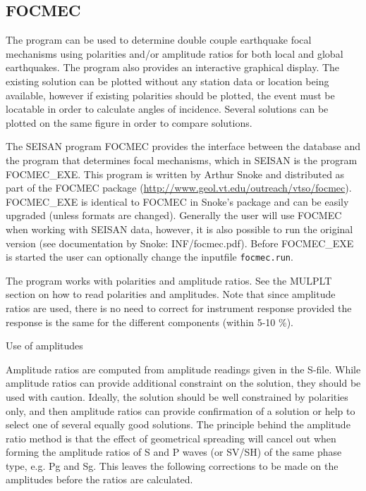 %
\subsection{FOCMEC}
\label{sect:focmec}

The program can be used to determine double couple earthquake focal 
mechanisms using polarities and/or amplitude ratios for both local 
and global earthquakes. The program also provides an interactive 
graphical display. The existing solution can be plotted without any 
station data or location being available, however if existing polarities 
should be plotted, the event must be locatable in order to calculate 
angles of incidence. Several solutions can be plotted on the same 
figure in order to compare solutions.

The SEISAN program FOCMEC provides the interface between the database 
and the program that determines focal mechanisms, which in SEISAN is 
the program FOCMEC\_EXE. This program is written by Arthur Snoke 
\citep{snoke1984} 
and distributed as part of the FOCMEC package 
(\url{http://www.geol.vt.edu/outreach/vtso/focmec}). 
FOCMEC\_EXE is identical to FOCMEC in Snoke's package and can be 
easily upgraded (unless formats are changed). Generally the user 
will use FOCMEC when working with SEISAN data, however, it is also 
possible to run the original version (see documentation by Snoke: 
INF/focmec.pdf).
Before FOCMEC\_EXE is started the
user can optionally change the inputfile \texttt{focmec.run}.


The program works with polarities and amplitude ratios. See the MULPLT section 
on how to read polarities and amplitudes.  Note that since amplitude 
ratios are used, there is no need to correct for instrument response 
provided the response is the same for the different components (within 5-10 \%).

Use of amplitudes

Amplitude ratios are computed from amplitude readings given in the S-file. While amplitude ratios can provide additional constraint on the solution, they should be used with caution. Ideally, the solution should be well constrained by polarities only, and then amplitude ratios can provide confirmation of a solution or help to select one of several equally good solutions. The principle behind the amplitude ratio method is that the effect of geometrical spreading will cancel out when forming the amplitude ratios of S and P waves (or SV/SH) of the same phase type, e.g. Pg and Sg. This leaves the following corrections  to be made  on the amplitudes before the ratios are calculated.

